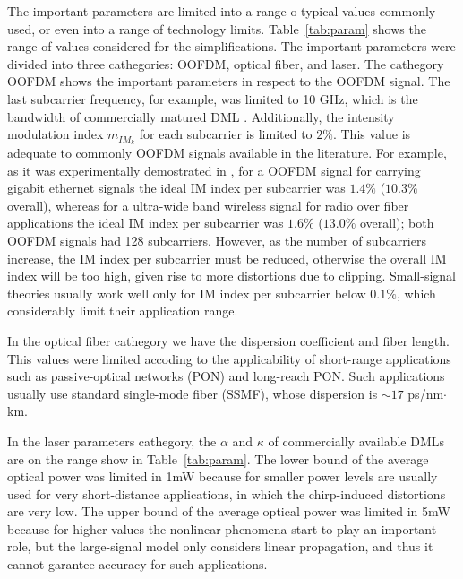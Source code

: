 \documentclass[journal]{IEEEtran}
\begin{document}
The important parameters are limited into a range o typical values commonly used, or even into a range of technology limits. Table~\ref{tab:param} shows the range of values considered for the simplifications. The important parameters were divided into three cathegories: OOFDM, optical fiber, and laser. The cathegory OOFDM shows the important parameters in respect to the OOFDM signal. The last subcarrier frequency, for example, was limited to 10 GHz, which is the bandwidth of commercially matured DML \cite{equalization}. Additionally, the intensity modulation index $m_{IM_k}$ for each subcarrier is limited to $2\%$. This value is adequate to commonly OOFDM signals available in the literature. For example, as it was experimentally demostrated in \cite{OFDM-GbE-UWB}, for a OOFDM signal for carrying gigabit ethernet signals the ideal IM index per subcarrier was $1.4\%$ ($10.3\%$ overall), whereas for a ultra-wide band wireless signal for radio over fiber applications the ideal IM index per subcarrier was $1.6\%$ ($13.0\%$ overall); both OOFDM signals had 128 subcarriers. However, as the number of subcarriers increase, the IM index per subcarrier must be reduced, otherwise the overall IM index will be too high, given rise to more distortions due to clipping. Small-signal theories usually work well only for IM index per subcarrier below $0.1\%$, which considerably limit their application range.

In the optical fiber cathegory we have the dispersion coefficient and fiber length. This values were limited accoding to the applicability of short-range applications such as passive-optical networks (PON) and long-reach PON. Such applications usually use standard single-mode fiber (SSMF), whose dispersion is $\sim 17$ ps/nm$\cdot$km.

In the laser parameters cathegory, the $\alpha$ and $\kappa$ of commercially available DMLs are on the range show in Table~\ref{tab:param}\cite{equalization}. The lower bound of the average optical power was limited in 1mW because for smaller power levels are usually used for very short-distance applications, in which the chirp-induced distortions are very low. The upper bound of the average optical power was limited in 5mW because for higher values the nonlinear phenomena start to play an important role, but the large-signal model only considers linear propagation, and thus it cannot garantee accuracy for such applications.
\end{document}
